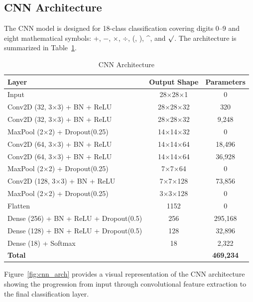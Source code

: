 \documentclass[conference]{IEEEtran}
\begin{document}
\subsection{CNN Architecture}

The CNN model is designed for 18-class classification covering digits 0--9 and eight mathematical symbols: +, $-$, $\times$, $\div$, (, ), \^{}, and $\surd$. The architecture is summarized in Table~\ref{tab:cnn_architecture}.

\begin{table}[htbp]
\caption{CNN Architecture}
\label{tab:cnn_architecture}
\centering
\begin{tabular}{|l|c|c|}
\hline
\textbf{Layer} & \textbf{Output Shape} & \textbf{Parameters} \\
\hline
Input & 28$\times$28$\times$1 & 0 \\
Conv2D (32, 3$\times$3) + BN + ReLU & 28$\times$28$\times$32 & 320 \\
Conv2D (32, 3$\times$3) + BN + ReLU & 28$\times$28$\times$32 & 9,248 \\
MaxPool (2$\times$2) + Dropout(0.25) & 14$\times$14$\times$32 & 0 \\
\hline
Conv2D (64, 3$\times$3) + BN + ReLU & 14$\times$14$\times$64 & 18,496 \\
Conv2D (64, 3$\times$3) + BN + ReLU & 14$\times$14$\times$64 & 36,928 \\
MaxPool (2$\times$2) + Dropout(0.25) & 7$\times$7$\times$64 & 0 \\
\hline
Conv2D (128, 3$\times$3) + BN + ReLU & 7$\times$7$\times$128 & 73,856 \\
MaxPool (2$\times$2) + Dropout(0.25) & 3$\times$3$\times$128 & 0 \\
\hline
Flatten & 1152 & 0 \\
Dense (256) + BN + ReLU + Dropout(0.5) & 256 & 295,168 \\
Dense (128) + BN + ReLU + Dropout(0.5) & 128 & 32,896 \\
Dense (18) + Softmax & 18 & 2,322 \\
\hline
\textbf{Total} & & \textbf{469,234} \\
\hline
\end{tabular}
\end{table}

Figure~\ref{fig:cnn_arch} provides a visual representation of the CNN architecture showing the progression from input through convolutional feature extraction to the final classification layer.
\end{document}
